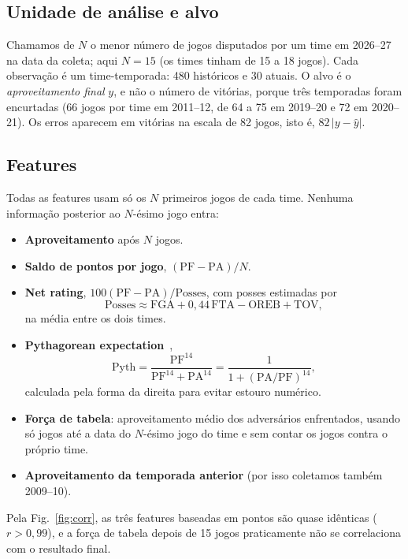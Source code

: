 \documentclass[conference]{IEEEtran}
\begin{document}
\subsection{Unidade de análise e alvo}
Chamamos de $N$ o menor número de jogos disputados por um time em 2026--27 na data da coleta; aqui $N=15$ (os times tinham de 15 a 18 jogos). Cada observação é um time-temporada: 480 históricos e 30 atuais. O alvo é o \emph{aproveitamento final} $y$, e não o número de vitórias, porque três temporadas foram encurtadas (66 jogos por time em 2011--12, de 64 a 75 em 2019--20 e 72 em 2020--21). Os erros aparecem em vitórias na escala de 82 jogos, isto é, $82\,|y-\hat y|$.

\subsection{Features}
Todas as features usam só os $N$ primeiros jogos de cada time. Nenhuma informação posterior ao $N$-ésimo jogo entra:
\begin{itemize}
\item \textbf{Aproveitamento} após $N$ jogos.
\item \textbf{Saldo de pontos por jogo}, $(\mathrm{PF}-\mathrm{PA})/N$.
\item \textbf{Net rating}, $100(\mathrm{PF}-\mathrm{PA})/\mathrm{Posses}$, com posses estimadas por~\cite{kubatko2007}
\begin{equation}
\mathrm{Posses} \approx \mathrm{FGA} + 0{,}44\,\mathrm{FTA} - \mathrm{OREB} + \mathrm{TOV},
\label{eq:poss}
\end{equation}
na média entre os dois times.
\item \textbf{Pythagorean expectation}~\cite{kubatko2007},
\begin{equation}
\mathrm{Pyth} = \frac{\mathrm{PF}^{14}}{\mathrm{PF}^{14}+\mathrm{PA}^{14}} = \frac{1}{1+(\mathrm{PA}/\mathrm{PF})^{14}},
\label{eq:pyth}
\end{equation}
calculada pela forma da direita para evitar estouro numérico.
\item \textbf{Força de tabela}: aproveitamento médio dos adversários enfrentados, usando só jogos até a data do $N$-ésimo jogo do time e sem contar os jogos contra o próprio time.
\item \textbf{Aproveitamento da temporada anterior} (por isso coletamos também 2009--10).
\end{itemize}
Pela Fig.~\ref{fig:corr}, as três features baseadas em pontos são quase idênticas ($r>0{,}99$), e a força de tabela depois de 15 jogos praticamente não se correlaciona com o resultado final.
\end{document}
